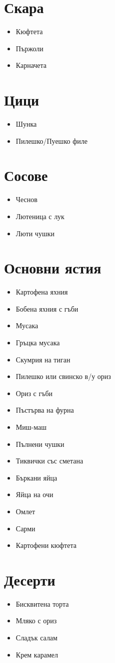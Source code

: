 \documentclass{article}
\begin{document}
\begin{multicols}{2}
\section{Скара}
\begin{itemize}
    \item{Кюфтета}
    \item{Пържоли}
    \item{Карначета}
\end{itemize}

\section{Цици}
\begin{itemize}
    \item{Шунка}
    \item{Пилешко/Пуешко филе}
\end{itemize}

\section{Сосове}
\begin{itemize}
    \item{Чеснов}
    \item{Лютеница с лук}
    \item{Люти чушки}
\end{itemize}

\section{Основни ястия}
\begin{itemize}
    \item{Картофена яхния}
    \item{Бобена яхния с гъби}
    \item{Мусака}
    \item{Гръцка мусака}
    \item{Скумрия на тиган}
    \item{Пилешко или свинско в/у ориз}
    \item{Ориз с гъби}
    \item{Пъстърва на фурна}
    \item{Миш-маш}
    \item{Пълнени чушки}
    \item{Тиквички със сметана}
    \item{Бъркани яйца}
    \item{Яйца на очи}
    \item{Омлет}
    \item{Сарми}
    \item{Картофени кюфтета}
\end{itemize}

\section{Десерти}
\begin{itemize}
    \item{Бисквитена торта}
    \item{Мляко с ориз}
    \item{Сладък салам}
    \item{Крем карамел}
\end{itemize}
\end{multicols}
\end{document}
